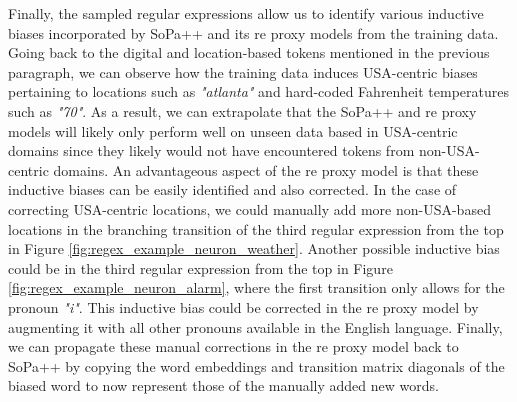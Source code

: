 Finally, the sampled regular expressions allow us to identify various inductive
biases incorporated by SoPa++ and its \ac{re} proxy models from the training data.
Going back to the digital and location-based tokens mentioned in the previous
paragraph, we can observe how the training data induces USA-centric biases
pertaining to locations such as \textit{"atlanta"} and hard-coded Fahrenheit
temperatures such as \textit{"70"}. As a result, we can extrapolate that the
SoPa++ and \ac{re} proxy models will likely only perform well on unseen data based in
USA-centric domains since they likely would not have encountered tokens from
non-USA-centric domains. An advantageous aspect of the \ac{re} proxy model is that
these inductive biases can be easily identified and also corrected. In the case
of correcting USA-centric locations, we could manually add more non-USA-based
locations in the branching transition of the third regular expression from the
top in Figure \ref{fig:regex_example_neuron_weather}. Another possible inductive
bias could be in the third regular expression from the top in Figure
\ref{fig:regex_example_neuron_alarm}, where the first transition only allows for
the pronoun \textit{"i"}. This inductive bias could be corrected in the \ac{re} proxy
model by augmenting it with all other pronouns available in the English
language. Finally, we can propagate these manual corrections in the \ac{re} proxy
model back to SoPa++ by copying the word embeddings and transition matrix
diagonals of the biased word to now represent those of the manually added new
words.

